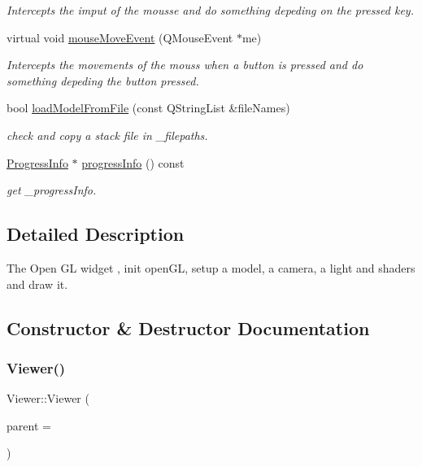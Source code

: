 \begin{DoxyCompactItemize}
\begin{DoxyCompactList}\small\item\em Intercepts the imput of the mousse and do something depeding on the pressed key. \end{DoxyCompactList}\item 
virtual void \mbox{\hyperlink{class_viewer_a3d05b37233c2d97f4e68b2ee5a1277e2}{mouse\+Move\+Event}} (Q\+Mouse\+Event $\ast$me)
\begin{DoxyCompactList}\small\item\em Intercepts the movements of the mouss when a button is pressed and do something depeding the button pressed. \end{DoxyCompactList}\item 
bool \mbox{\hyperlink{class_viewer_a1a35d9603576f7c9a1895a6311ad81d8}{load\+Model\+From\+File}} (const Q\+String\+List \&file\+Names)
\begin{DoxyCompactList}\small\item\em check and copy a stack file in \+\_\+filepaths. \end{DoxyCompactList}\item 
\mbox{\hyperlink{class_progress_info}{Progress\+Info}} $\ast$ \mbox{\hyperlink{class_viewer_a7990e46887a50148c6dda326484c1996}{progress\+Info}} () const
\begin{DoxyCompactList}\small\item\em get \+\_\+progress\+Info. \end{DoxyCompactList}\end{DoxyCompactItemize}


\subsection{Detailed Description}
The Open GL widget , init open\+GL, setup a model, a camera, a light and shaders and draw it. 

\subsection{Constructor \& Destructor Documentation}
\mbox{\label{class_viewer_a6a1f845092e1d4407adabb550e40431b}} 
\subsubsection{\texorpdfstring{Viewer()}{Viewer()}}
{\footnotesize\ttfamily Viewer\+::\+Viewer (\begin{DoxyParamCaption}\item[{Q\+Widget $\ast$}]{parent = {} }\end{DoxyParamCaption})}



